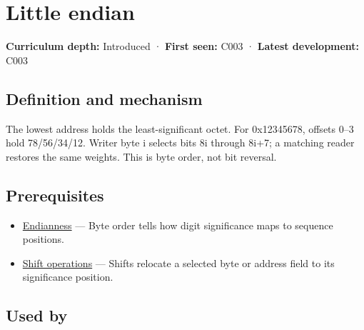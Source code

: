 \hypertarget{appendix-367b6abf460e}{}\label{referencestart:appendix-367b6abf460e}
\section{Little endian}\label{appendix-367b6abf460e-little-endian}

\hypertarget{appendix-367b6abf460e-little-endian}{}

\textbf{Curriculum depth:} Introduced · \textbf{First seen:} C003 · \textbf{Latest development:} C003

\begin{allmightroledefinition}

\subsection{Definition and mechanism}\label{appendix-367b6abf460e-definition-and-mechanism}

\hypertarget{appendix-367b6abf460e-definition-and-mechanism}{}

The lowest address holds the least-significant octet. For 0x12345678, offsets 0--3 hold 78/56/34/12. Writer byte i selects bits 8i through 8i+7; a matching reader restores the same weights. This is byte order, not bit reversal.

\end{allmightroledefinition}

\subsection{Prerequisites}\label{appendix-367b6abf460e-prerequisites}

\hypertarget{appendix-367b6abf460e-prerequisites}{}

\begin{itemize}
\tightlist
\item
  \hyperref[appendix-bc07c3d25b18]{Endianness} --- Byte order tells how digit significance maps to sequence positions.
\item
  \hyperref[appendix-73425b25118e]{Shift operations} --- Shifts relocate a selected byte or address field to its significance position.
\end{itemize}

\subsection{Used by}\label{appendix-367b6abf460e-used-by}

